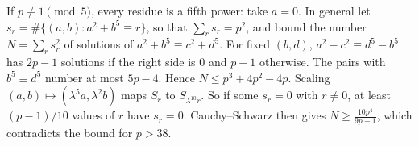\documentclass[11pt,a4paper]{article}
\begin{document}
 If $p\not\equiv1\pmod5$, every residue is a fifth power: take $a=0$. In general let $s_r=\#\{(a,b):a^2+b^5\equiv r\}$, so that $\sum_r s_r=p^2$, and bound the number $N=\sum_r s_r^2$ of solutions of $a^2+b^5\equiv c^2+d^5$.
 For fixed $(b,d)$, $a^2-c^2\equiv d^5-b^5$ has $2p-1$ solutions if the right side is $0$ and $p-1$ otherwise. The pairs with $b^5\equiv d^5$ number at most $5p-4$. Hence $N\le p^3+4p^2-4p$.
 Scaling $(a,b)\mapsto(\lambda^5a,\lambda^2b)$ maps $S_r$ to $S_{\lambda^{10}r}$. So if some $s_r=0$ with $r\ne0$, at least $(p-1)/10$ values of $r$ have $s_r=0$. Cauchy--Schwarz then gives $N\ge\frac{10p^4}{9p+1}$, which contradicts the bound for $p>38$.
\end{document}
